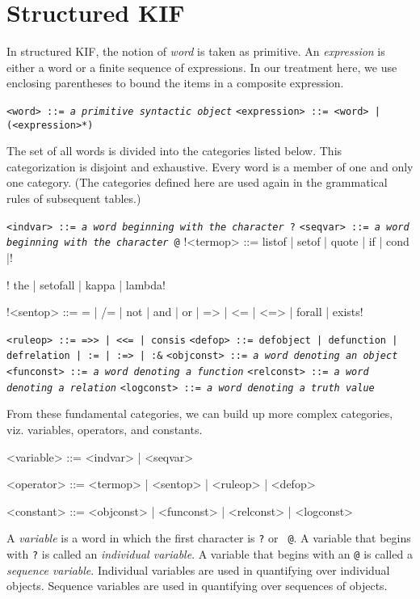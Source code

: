 \section{Structured KIF}

In structured KIF, the notion of {\it word} is taken as primitive.  An {\it expression}
is either a word or a finite sequence of expressions.  In our treatment here, we use
enclosing parentheses to bound the items in a composite expression.

\medskip
{\tt <word> ::= {\it a primitive syntactic object}}
\medskip
{\tt <expression> ::= <word> | (<expression>*)}
\medskip

The set of all words is divided into the categories listed below.  This categorization
is disjoint and exhaustive.  Every word is a member of one and only one category. 
(The categories defined here are used again in the grammatical rules of subsequent
tables.)

\medskip
{\tt <indvar> ::= {\it a word beginning with the character} ?}
\medskip
{\tt <seqvar> ::= {\it a word beginning with the character} @}
\medskip
\verbatim!<termop> ::= listof | setof | quote | if | cond |!\par
\verbatim!             the | setofall | kappa | lambda!\par
\medskip
\verbatim!<sentop> ::= = | /= | not | and | or | => | <= | <=> | forall | exists!\par
\medskip
{\tt <ruleop> ::= =>> | <<= | consis}
\medskip
{\tt <defop> ::= defobject | defunction | defrelation | := | :=> | :\&}
\medskip
{\tt <objconst> ::= {\it a word denoting an object}}
\medskip
{\tt <funconst> ::= {\it a word denoting a function}}
\medskip
{\tt <relconst> ::= {\it a word denoting a relation}}
\medskip
{\tt <logconst> ::= {\it a word denoting a truth value}}
\medskip

From these fundamental categories, we can build up more complex categories, viz.
variables, operators, and constants.

\medskip
\beginverbatim
<variable> ::= <indvar> | <seqvar>

<operator> ::= <termop> | <sentop> | <ruleop> | <defop>

<constant> ::= <objconst> | <funconst> | <relconst> | <logconst>
\endverbatim
\medskip

A {\it variable} is a word in which the first character is {\tt ?} or {\tt
@}.  A variable that begins with {\tt ?} is called an {\it individual
variable}.  A variable that begins with an {\tt @} is called a {\it sequence
variable}.  Individual variables are used in quantifying over individual
objects.  Sequence variables are used in quantifying over sequences of objects.

